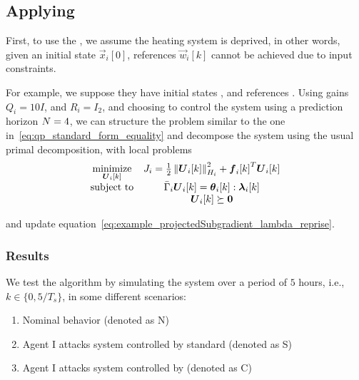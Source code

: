 \documentclass[../main.tex]{subfiles}
\begin{document}
\subsection{Applying \rpdmpcss{}}
First, to use the \rpdmpcss{}, we assume the heating system is deprived, in other words, given an initial state $\vec{x}_{i}[0]$, references $\vec{w}_{i}[k]$ cannot be achieved due to input constraints.

For example, we suppose they have initial states
,
and references
.
Using gains
$Q_{i}=10I$,
and
$R_{i}=   I_{2}$,
and choosing to control the system using a prediction horizon
$N=4$,
we can structure the \dmpc{} problem similar to the one in~\eqref{eq:qp_standard_form_equality} and decompose the system using the usual primal decomposition, with local problems
\begin{equation}
  \label{eq:houses_deprived_local_problem}
  \begin{matrix}
    \minimize\limits_{\vec{U}_{i}[k]}&\obji=\frac{1}{2}\norm{\vec{U}_{i}[k]}^{2}_{H_{i}} + {\vec{f}_{i}[k]}^{T}\vec{U}_{i}[k]\\
    \mathrm{subject~ to} & \bar{\Gamma}_{i}\vec{U}_{i}[k] = \thetaik:\lambdaik\\
                                     &\vec{U}_{i}[k]\succeq\0
  \end{matrix}
\end{equation}

and update equation~\eqref{eq:example_projectedSubgradient_lambda_reprise}.

\subsubsection{Results}\label{sec:results}
We test the algorithm by simulating the system over a period of
$5$
hours, i.e.,
${k\in\{0,5/T_{s}\}}$,
in some different scenarios:
\begin{enumerate}
  \item Nominal behavior (denoted as N)
  \item Agent I attacks system controlled by standard \dmpc{} (denoted as S)\label{it:case_selfish}
  \item Agent I attacks system controlled by \rpdmpcss{} (denoted as C)\label{it:case_selfish_recovered}
\end{enumerate}
\end{document}
